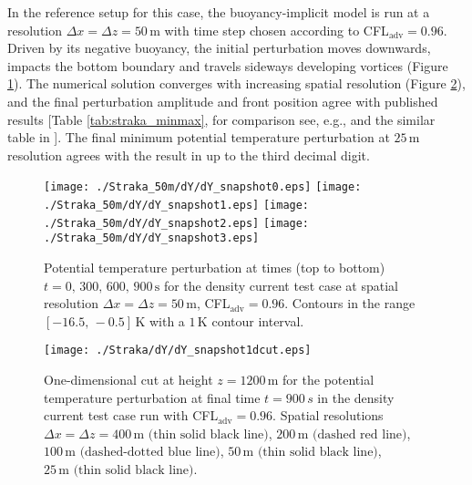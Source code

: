 \documentclass{ametsoc}
\theoremstyle{definition}
\begin{document}
In the reference setup for this case, the buoyancy-implicit model is run at a resolution $\Delta x=\Delta z=50\,\textrm{m}$ with time step chosen according to CFL$_\textrm{adv}=0.96$. Driven by its negative buoyancy, the initial perturbation moves downwards, impacts the bottom boundary and travels sideways developing vortices (Figure \ref{fig:straka}). The numerical solution converges with increasing spatial resolution (Figure \ref{fig:straka1dcut}), and the final perturbation amplitude and front position agree with published results [Table \ref{tab:straka_minmax}, for comparison see, e.g., \cite{GiraldoRestelli2008} and the similar table in \cite{MelvinEtAl2018}]. The final minimum potential temperature perturbation at $25\,\textrm{m}$ resolution agrees with the result in \cite{MelvinEtAl2018} up to the third decimal digit.

\begin{figure}
\centering
 \texttt{[image: ./Straka\_50m/dY/dY\_snapshot0.eps]}
 \texttt{[image: ./Straka\_50m/dY/dY\_snapshot1.eps]}
 \texttt{[image: ./Straka\_50m/dY/dY\_snapshot2.eps]}
 \texttt{[image: ./Straka\_50m/dY/dY\_snapshot3.eps]}
 \caption{Potential temperature perturbation at times (top to bottom) $t=0,\,300,\,600,\,900\,\textrm{s}$ for the density current test case at spatial resolution $\Delta x=\Delta z=50\,\textrm{m}$, CFL$_\textrm{adv}=0.96$. Contours in the range $[-16.5,\,-0.5]\,\textrm{K}$ with a $1\,\textrm{K}$ contour interval.}
 \label{fig:straka}
\end{figure}

\begin{figure}
\centering
  \texttt{[image: ./Straka/dY/dY\_snapshot1dcut.eps]}
 \caption{One-dimensional cut at height $z=1200\,\textrm{m}$ for the potential temperature perturbation at final time $t=900\, s$ in the density current test case run with CFL$_\textrm{adv}=0.96$. Spatial resolutions $\Delta x=\Delta z=400\,\textrm{m (thin solid black line)}$, $200\,\textrm{m (dashed red line)}$, $100\,\textrm{m (dashed-dotted blue line)}$, $50\,\textrm{m (thin solid black line)}$, $25\,\textrm{m (thin solid black line)}$.}
 \label{fig:straka1dcut}
\end{figure}
\end{document}
